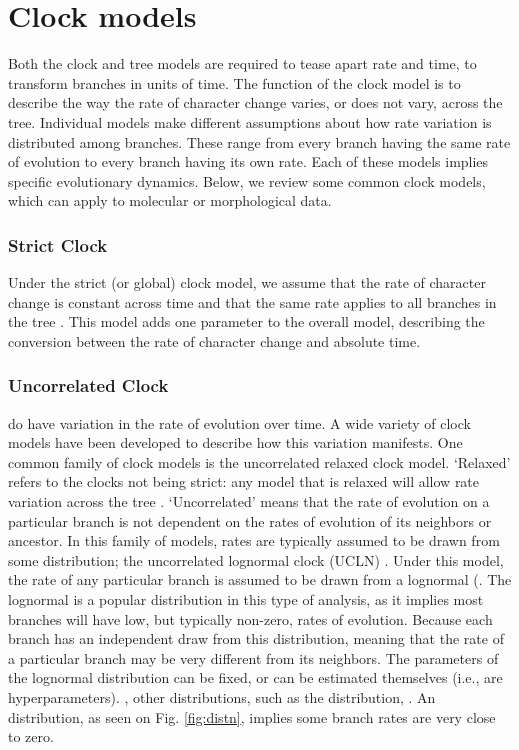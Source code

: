 \section{Clock models}
Both the clock and tree models are required to tease apart rate and time,  to transform branches in units of time.
The function of the clock model is to describe the way the rate of character change varies, or does not vary, across the tree.
Individual models make different assumptions about how rate variation is distributed among branches.
These range from  every branch having the same rate of evolution to every branch having its own rate.
Each of these models implies specific evolutionary dynamics.
Below, we review some common clock models, which can apply to molecular or morphological data.

\subsubsection{Strict Clock}
Under the strict (or global) clock model, we assume that the rate of character change is constant across time and that the same rate applies to all branches in the tree \citep{Zuckerkandl1962, Zuckerkandl1965EvolutionaryDivergenceConvergence}.
This model adds one parameter to the overall model, describing the conversion between the rate of character change  and absolute time.

\subsubsection{Uncorrelated Clock}
 do have variation in the rate of evolution over time.
A wide variety of clock models have been developed to describe how this variation manifests.
One common family of clock models is the uncorrelated relaxed clock model.
`Relaxed' refers to the clocks not being strict: any model that is relaxed will allow rate variation across the tree \citep{Drummond2006, Drummond2007}.
`Uncorrelated' means that the rate of evolution on a particular branch is not dependent on the rates of evolution of its neighbors or ancestor.
In this family of models, rates are typically assumed to be drawn from some distribution;
the uncorrelated lognormal clock (UCLN) .
Under this model, the rate of any particular branch is assumed to be drawn from a lognormal  (.
The lognormal is a popular distribution in this type of analysis, as it implies most branches will have low, but typically non-zero, rates of evolution.
Because each branch has an independent draw from this distribution, meaning that the rate of a particular branch may be very different from its neighbors.
The parameters of the lognormal distribution can be fixed, or can be estimated themselves (i.e., are hyperparameters).
, other distributions, such as the  distribution, .
An  distribution, as seen on Fig. \ref{fig:distn}, implies some branch rates are very close to zero.

